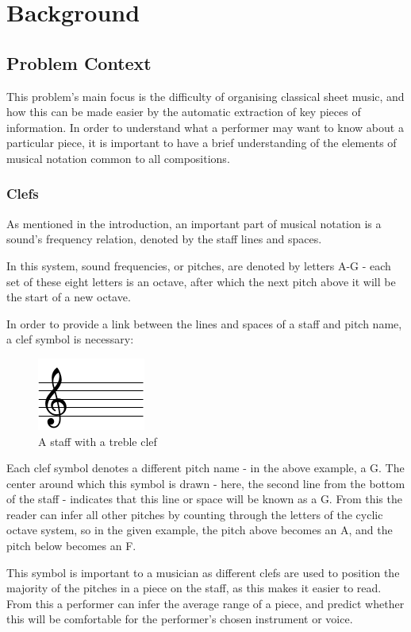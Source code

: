 \section{Background}
\subsection{Problem Context}
This problem's main focus is the difficulty of organising classical sheet music, and how this can be made easier by the automatic extraction of key pieces  of information. In order to understand what a performer may want to know about a particular piece, it is important to have a brief understanding of the elements of musical notation common to all compositions.
\subsubsection{Clefs}
As mentioned in the introduction, an important part of musical notation is a sound's frequency relation, denoted by the staff lines and spaces. 

In this system, sound frequencies, or pitches, are denoted by letters A-G - each set of these eight letters is an octave, after which the next pitch above it will be the start of a new octave.

In order to provide a link between the lines and spaces of a staff and pitch name, a clef symbol is necessary:
\begin{figure}[htbp]
    \centering
        \includegraphics{clef-crop.pdf}
    \caption{A staff with a treble clef}
\end{figure}

Each clef symbol denotes a different pitch name - in the above example, a G. The center around which this symbol is drawn - here, the second line from the bottom of the staff - indicates that this line or space will be known as a G. From this the reader can infer all other pitches by counting through the letters of the cyclic octave system, so in the given example, the pitch above becomes an A, and the pitch below becomes an F.

This symbol is important to a musician as different clefs are used to position the majority of the pitches in a piece on the staff, as this makes it easier to read. From this a performer can infer the average range of a piece, and predict whether this will be comfortable for the performer's chosen instrument or voice.


